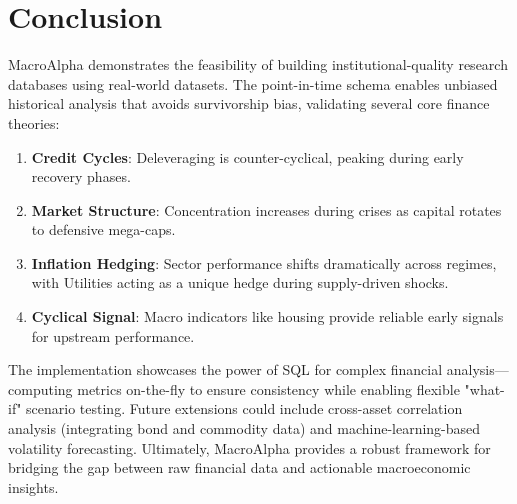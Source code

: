 \documentclass[10pt,a4paper]{article}
\begin{document}
\section{Conclusion}

MacroAlpha demonstrates the feasibility of building institutional-quality research databases using real-world datasets. The point-in-time schema enables unbiased historical analysis that avoids survivorship bias, validating several core finance theories:
\begin{enumerate}
    \item \textbf{Credit Cycles}: Deleveraging is counter-cyclical, peaking during early recovery phases.
    \item \textbf{Market Structure}: Concentration increases during crises as capital rotates to defensive mega-caps.
    \item \textbf{Inflation Hedging}: Sector performance shifts dramatically across regimes, with Utilities acting as a unique hedge during supply-driven shocks.
    \item \textbf{Cyclical Signal}: Macro indicators like housing provide reliable early signals for upstream performance.
\end{enumerate}
The implementation showcases the power of SQL for complex financial analysis—computing metrics on-the-fly to ensure consistency while enabling flexible "what-if" scenario testing. Future extensions could include cross-asset correlation analysis (integrating bond and commodity data) and machine-learning-based volatility forecasting. Ultimately, MacroAlpha provides a robust framework for bridging the gap between raw financial data and actionable macroeconomic insights.
\end{document}

